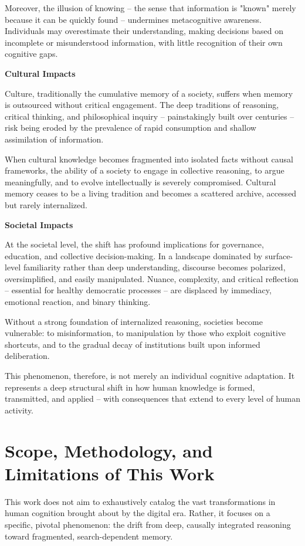 Moreover, the illusion of knowing -- the sense that information is
"known" merely because it can be quickly found -- undermines
metacognitive awareness. Individuals may overestimate their
understanding, making decisions based on incomplete or misunderstood
information, with little recognition of their own cognitive gaps.

\textbf{Cultural Impacts}

Culture, traditionally the cumulative memory of a society, suffers when
memory is outsourced without critical engagement. The deep traditions of
reasoning, critical thinking, and philosophical inquiry -- painstakingly
built over centuries -- risk being eroded by the prevalence of rapid
consumption and shallow assimilation of information.

When cultural knowledge becomes fragmented into isolated facts without
causal frameworks, the ability of a society to engage in collective
reasoning, to argue meaningfully, and to evolve intellectually is
severely compromised. Cultural memory ceases to be a living tradition
and becomes a scattered archive, accessed but rarely internalized.

\textbf{Societal Impacts}

At the societal level, the shift has profound implications for
governance, education, and collective decision-making. In a landscape
dominated by surface-level familiarity rather than deep understanding,
discourse becomes polarized, oversimplified, and easily manipulated.
Nuance, complexity, and critical reflection -- essential for healthy
democratic processes -- are displaced by immediacy, emotional reaction,
and binary thinking.

Without a strong foundation of internalized reasoning, societies become
vulnerable: to misinformation, to manipulation by those who exploit
cognitive shortcuts, and to the gradual decay of institutions built upon
informed deliberation.

This phenomenon, therefore, is not merely an individual cognitive
adaptation. It represents a deep structural shift in how human knowledge
is formed, transmitted, and applied -- with consequences that extend to
every level of human activity.


\section{Scope, Methodology, and Limitations of This Work}

This work does not aim to exhaustively catalog the vast transformations
in human cognition brought about by the digital era. Rather, it focuses
on a specific, pivotal phenomenon: the drift from deep, causally
integrated reasoning toward fragmented, search-dependent memory.

